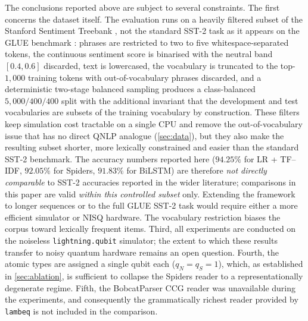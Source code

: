 \documentclass[runningheads]{llncs}
\begin{document}
The conclusions reported above are subject to several constraints.
The first concerns the dataset itself. The evaluation runs on a
heavily filtered subset of the Stanford Sentiment Treebank
\cite{socher2013}, not the standard SST-2 task as it appears on the
GLUE benchmark \cite{wang2018glue}: phrases are restricted to two to
five whitespace-separated tokens, the continuous sentiment score is
binarised with the neutral band \([0.4, 0.6]\) discarded, text is
lowercased, the vocabulary is truncated to the top-\(1{,}000\)
training tokens with out-of-vocabulary phrases discarded, and a
deterministic two-stage balanced sampling produces a class-balanced
\(5{,}000/400/400\) split with the additional invariant that the
development and test vocabularies are subsets of the training
vocabulary by construction. These filters keep simulation cost
tractable on a single CPU and remove the out-of-vocabulary issue
that has no direct QNLP analogue (\cref{sec:data}), but they also
make the resulting subset shorter, more lexically constrained and
easier than the standard SST-2 benchmark. The accuracy numbers
reported here (\(94.25\%\) for LR + TF--IDF, \(92.05\%\) for Spiders,
\(91.83\%\) for BiLSTM) are therefore \emph{not directly comparable}
to SST-2 accuracies reported in the wider literature; comparisons in
this paper are valid \emph{within this controlled subset} only.
Extending the framework to longer sequences or to the full GLUE
SST-2 task would require either a more efficient simulator or
NISQ hardware. The vocabulary restriction biases the corpus toward
lexically frequent items. Third, all experiments are conducted on the
noiseless \texttt{lightning.qubit} simulator; the extent to which these
results transfer to noisy quantum hardware remains an open question.
Fourth, the atomic types are assigned a single qubit each
(\(q_N = q_S = 1\)), which, as established in \cref{sec:ablation},
is sufficient to collapse the Spiders reader to a representationally
degenerate regime. Fifth, the BobcatParser CCG reader was unavailable
during the experiments, and consequently the grammatically richest
reader provided by \texttt{lambeq} is not included in the comparison.
\end{document}
